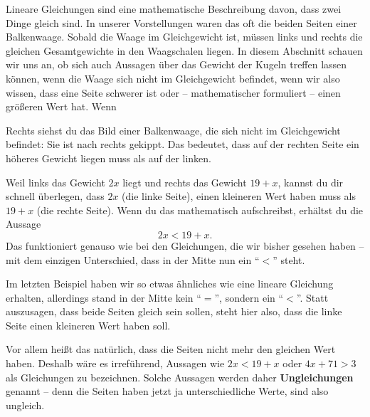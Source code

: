 \documentclass[../../main.tex]{subfiles}
\begin{document}
Lineare Gleichungen sind eine mathematische Beschreibung davon, dass zwei Dinge gleich sind. In unserer Vorstellungen waren das oft die beiden Seiten einer Balkenwaage. Sobald die Waage im Gleichgewicht ist, müssen links und rechts die gleichen Gesamtgewichte in den Waagschalen liegen. In diesem Abschnitt schauen wir uns an, ob sich auch Aussagen über das Gewicht der Kugeln treffen lassen können, wenn die Waage sich nicht im Gleichgewicht befindet, wenn wir also wissen, dass eine Seite schwerer ist oder -- mathematischer formuliert -- einen größeren Wert hat.
Wenn 
\begin{example}{}
    
    Rechts siehst du das Bild einer Balkenwaage, die sich nicht im Gleichgewicht befindet: Sie ist nach rechts gekippt. Das bedeutet, dass auf der rechten Seite ein höheres Gewicht liegen muss als auf der linken.
    
    Weil links das Gewicht $2x$ liegt und rechts das Gewicht $19+x$, kannst du dir schnell überlegen, dass $2x$ (die linke Seite), einen kleineren Wert haben muss als $19+x$ (die rechte Seite). Wenn du das mathematisch aufschreibst, erhältst du die Aussage
    \[2x<19+x.\]
    Das funktioniert genauso wie bei den Gleichungen, die wir bisher gesehen haben -- mit dem einzigen Unterschied, dass in der Mitte nun ein \enquote{$<$} steht.
\end{example}

Im letzten Beispiel haben wir so etwas ähnliches wie eine lineare Gleichung erhalten, allerdings stand in der Mitte kein \enquote{$=$}, sondern ein \enquote{$<$}. Statt auszusagen, dass beide Seiten gleich sein sollen, steht hier also, dass die linke Seite einen kleineren Wert haben soll. 

Vor allem heißt das natürlich, dass die Seiten nicht mehr den gleichen Wert haben. Deshalb wäre es irreführend, Aussagen wie $2x<19+x$ oder $4x+71>3$ als Gleichungen zu bezeichnen. Solche Aussagen werden daher \textbf{Ungleichungen} genannt -- denn die Seiten haben jetzt ja unterschiedliche Werte, sind also ungleich.
\end{document}
